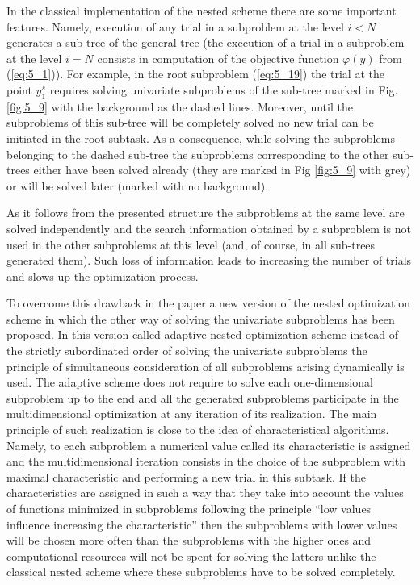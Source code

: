 In the classical implementation of the nested scheme there are some important features. Namely, execution of any trial in a subproblem at the level $i<N$ generates a sub-tree of the general tree (the execution of a trial in a subproblem at the level $i=N$ consists in computation of the objective function $\varphi(y)$ from (\ref{eq:5_1})). For example, in the root subproblem (\ref{eq:5_19})  the trial at the point $y_1^s$  requires solving univariate subproblems of the sub-tree marked in Fig.\ref{fig:5_9} with the background as the dashed lines. Moreover, until the subproblems of this sub-tree will be completely solved no new trial can be initiated in the root subtask. As a consequence, while solving the subproblems belonging to the dashed sub-tree the subproblems corresponding to the other sub-trees either have been solved already (they are marked in Fig \ref{fig:5_9} with grey) or will be solved later (marked with no background).

As it follows from the presented structure the subproblems at the same level are solved independently and the search information obtained by a subproblem is not used in the other subproblems at this level (and, of course, in all sub-trees generated them).  Such loss of information leads to increasing the number of trials and slows up the optimization process. 

To overcome this drawback in the paper \cite{5_GerGriGer} a new version of the nested optimization scheme in which the other way of solving the univariate subproblems has been proposed. In this version called adaptive nested optimization scheme instead of the strictly subordinated order of solving the univariate subproblems the principle of simultaneous consideration of all subproblems arising dynamically is used. The adaptive scheme does not require to solve each  one-dimensional subproblem  up to the end and all the generated subproblems participate in the multidimensional optimization at any iteration of its realization. The main principle of such realization is close to the idea of characteristical algorithms. Namely, to each subproblem a numerical value called its characteristic is assigned and the multidimensional iteration consists in the choice of the subproblem with maximal characteristic and performing a new trial in this subtask. If the characteristics are assigned in such a way that they take into account the values of functions minimized in subproblems following the principle “low values influence increasing the characteristic” then the subproblems with lower values will be chosen more often than the subproblems with the higher ones and computational resources will not be spent for solving the latters unlike the classical nested scheme where these subproblems have to be solved completely. 

